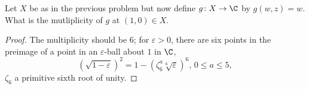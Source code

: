 \documentclass[10pt]{amsart}
\begin{document}
\begin{thm}
  Let $X$ be as in the previous problem but now define $g \colon X \rightarrow \C$ by $g(w,z) = w$.
  What is the mutliplicity of $g$ at $(1,0) \in X$.
  
  \begin{proof}
    The multiplicity should be 6; for $\varepsilon > 0$, there are six points in the preimage of a point in an $\varepsilon$-ball about $1$ in $\C$,
    $$(\sqrt{1 - \varepsilon})^2 = 1 - (\zeta_6^a\sqrt[6]{\varepsilon})^6,\, 0 \leq a \leq 5,$$
    $\zeta_6$ a primitive sixth root of unity.
  \end{proof}
\end{thm}
\end{document}
